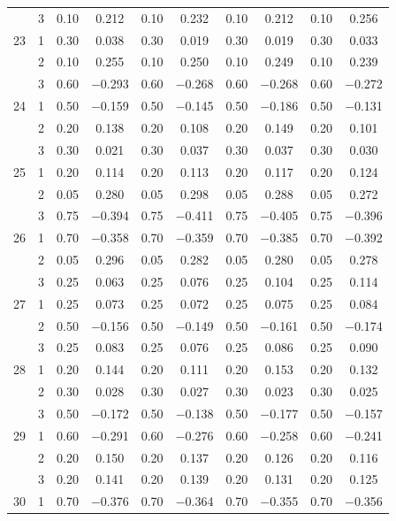 \begin{longtable}{llcccccccc}
   & 3 & 0.10 & 0.212 & 0.10 & 0.232 & 0.10 & 0.212 & 0.10 & 0.256 \\ 
  23 & 1 & 0.30 & 0.038 & 0.30 & 0.019 & 0.30 & 0.019 & 0.30 & 0.033 \\ 
   & 2 & 0.10 & 0.255 & 0.10 & 0.250 & 0.10 & 0.249 & 0.10 & 0.239 \\ 
   & 3 & 0.60 & $-$0.293 & 0.60 & $-$0.268 & 0.60 & $-$0.268 & 0.60 & $-$0.272 \\ 
  24 & 1 & 0.50 & $-$0.159 & 0.50 & $-$0.145 & 0.50 & $-$0.186 & 0.50 & $-$0.131 \\ 
   & 2 & 0.20 & 0.138 & 0.20 & 0.108 & 0.20 & 0.149 & 0.20 & 0.101 \\ 
   & 3 & 0.30 & 0.021 & 0.30 & 0.037 & 0.30 & 0.037 & 0.30 & 0.030 \\ 
  25 & 1 & 0.20 & 0.114 & 0.20 & 0.113 & 0.20 & 0.117 & 0.20 & 0.124 \\ 
   & 2 & 0.05 & 0.280 & 0.05 & 0.298 & 0.05 & 0.288 & 0.05 & 0.272 \\ 
   & 3 & 0.75 & $-$0.394 & 0.75 & $-$0.411 & 0.75 & $-$0.405 & 0.75 & $-$0.396 \\ 
  26 & 1 & 0.70 & $-$0.358 & 0.70 & $-$0.359 & 0.70 & $-$0.385 & 0.70 & $-$0.392 \\ 
   & 2 & 0.05 & 0.296 & 0.05 & 0.282 & 0.05 & 0.280 & 0.05 & 0.278 \\ 
   & 3 & 0.25 & 0.063 & 0.25 & 0.076 & 0.25 & 0.104 & 0.25 & 0.114 \\ 
  27 & 1 & 0.25 & 0.073 & 0.25 & 0.072 & 0.25 & 0.075 & 0.25 & 0.084 \\ 
   & 2 & 0.50 & $-$0.156 & 0.50 & $-$0.149 & 0.50 & $-$0.161 & 0.50 & $-$0.174 \\ 
   & 3 & 0.25 & 0.083 & 0.25 & 0.076 & 0.25 & 0.086 & 0.25 & 0.090 \\ 
  28 & 1 & 0.20 & 0.144 & 0.20 & 0.111 & 0.20 & 0.153 & 0.20 & 0.132 \\ 
   & 2 & 0.30 & 0.028 & 0.30 & 0.027 & 0.30 & 0.023 & 0.30 & 0.025 \\ 
   & 3 & 0.50 & $-$0.172 & 0.50 & $-$0.138 & 0.50 & $-$0.177 & 0.50 & $-$0.157 \\ 
  29 & 1 & 0.60 & $-$0.291 & 0.60 & $-$0.276 & 0.60 & $-$0.258 & 0.60 & $-$0.241 \\ 
   & 2 & 0.20 & 0.150 & 0.20 & 0.137 & 0.20 & 0.126 & 0.20 & 0.116 \\ 
   & 3 & 0.20 & 0.141 & 0.20 & 0.139 & 0.20 & 0.131 & 0.20 & 0.125 \\ 
  30 & 1 & 0.70 & $-$0.376 & 0.70 & $-$0.364 & 0.70 & $-$0.355 & 0.70 & $-$0.356 \\ 

\end{longtable}
